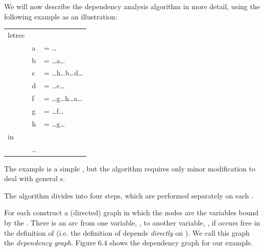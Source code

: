 {We will now describe the dependency analysis algorithm in more detail,
using the following example as an illustration:
\begin{mlcoded}
	\begin{tabular}{lll}
		letrec && \\
		&a & = \ldots \\
		&b & = \ldots a\ldots \\
		&c &= \ldots h\ldots b\ldots d\ldots \\
		&d &= \ldots c\ldots \\
		&f &= \ldots g\ldots h\ldots a\ldots \\
		&g &= \ldots f\ldots \\
		&h &= \ldots g\ldots \\
		in &&\\
		&\ldots &
	\end{tabular}
\end{mlcoded}
The example is a simple , but the algorithm requires only minor
modification to deal with general s.

The algorithm divides into four steps, which are performed separately on each .
\begin{numbered}
\item For each  construct a (directed) graph in which the nodes are the
variables bound by the . There is an arc from one variable, , to
another variable, , if  occurs free in the definition of  (i.e. the definition
of  depends \textit{directly} on ). We call this graph the \textit{dependency graph}.
Figure 6.4 shows the dependency graph for our example.
\begin{figure}[h]
	\centering

\end{figure}
\end{numbered}}
